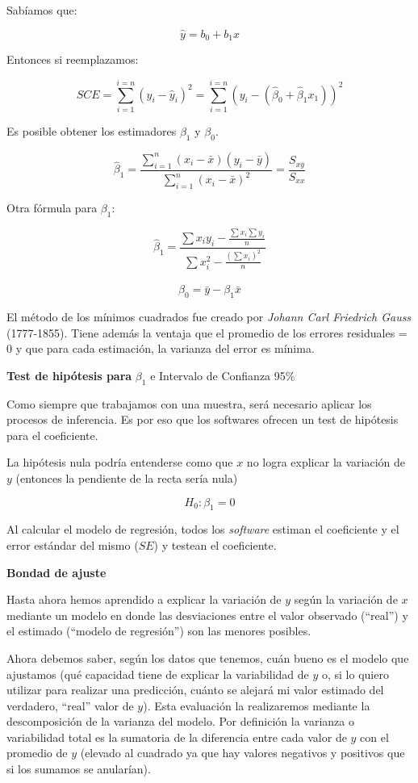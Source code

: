 \documentclass[
  spanish,
  a4paper,
]{scrbook}
\begin{document}
Sabíamos que:

\[
\hat{y} = b_0 + b_1x
\]

Entonces si reemplazamos:

\[
SCE = \sum_{i=1}^{i=n} (y_i-\hat{y}_i)^2 =  \sum_{i=1}^{i=n}(y_i-(\hat{\beta}_0 + \hat{\beta}_1x_1))^2
\]

Es posible obtener los estimadores \(\beta_1\) y \(\beta_0\).

\[
\hat{\beta}_1 = \frac{\sum_{i=1}^{n}(x_i - \bar{x})(y_i - \bar{y})}{\sum_{i=1}^{n}(x_i-\bar{x})^2} = \frac{S_{xy}}{S_{xx}}
\]

Otra fórmula para \(\beta_1\):

\[
\hat{\beta}_1 = \frac{\sum x_iy_i-\frac{\sum x_i \sum y_i}{n}}{\sum x_i^2 - \frac{(\sum x_i)^2}{n}}
\]

\[
\hat{\beta}_0 = \bar{y} - \beta_1\bar{x}
\]

El método de los mínimos cuadrados fue creado por \emph{Johann Carl
Friedrich Gauss} (1777-1855). Tiene además la ventaja que el promedio de
los errores residuales = 0 y que para cada estimación, la varianza del
error es mínima.

\textbf{Test de hipótesis para} \(\beta_1\) e Intervalo de Confianza
95\%

Como siempre que trabajamos con una muestra, será necesario aplicar los
procesos de inferencia. Es por eso que los softwares ofrecen un test de
hipótesis para el coeficiente.

La hipótesis nula podría entenderse como que \(x\) no logra explicar la
variación de \(y\) (entonces la pendiente de la recta sería nula)

\[
H_0: \beta_1 = 0
\]

Al calcular el modelo de regresión, todos los \emph{software} estiman el
coeficiente y el error estándar del mismo (\(SE\)) y testean el
coeficiente.

\textbf{Bondad de ajuste}

Hasta ahora hemos aprendido a explicar la variación de \(y\) según la
variación de \(x\) mediante un modelo en donde las desviaciones entre el
valor observado (``real'') y el estimado (``modelo de regresión'') son
las menores posibles.

Ahora debemos saber, según los datos que tenemos, cuán bueno es el
modelo que ajustamos (qué capacidad tiene de explicar la variabilidad de
\(y\) o, si lo quiero utilizar para realizar una predicción, cuánto se
alejará mi valor estimado del verdadero, ``real'' valor de \(y\)). Esta
evaluación la realizaremos mediante la descomposición de la varianza del
modelo. Por definición la varianza o variabilidad total es la sumatoria
de la diferencia entre cada valor de \(y\) con el promedio de \(y\)
(elevado al cuadrado ya que hay valores negativos y positivos que si los
sumamos se anularían).
\end{document}
